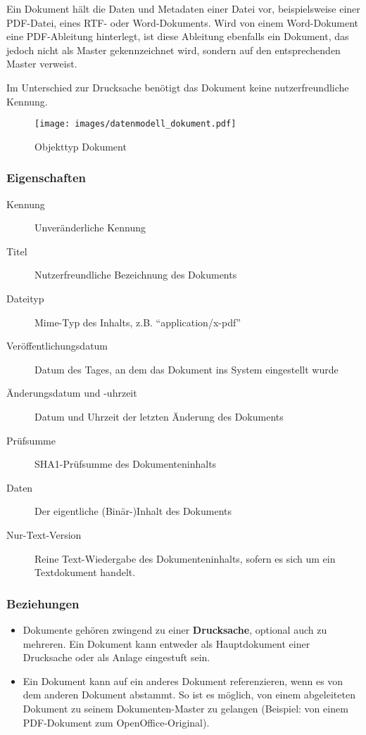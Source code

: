 \documentclass[,a4paper]{article}
\makeatletter
\def\maxwidth{\ifdim\Gin@nat@width>\linewidth\linewidth
\else\Gin@nat@width\fi}
\let\Oldincludegraphics\includegraphics
\renewcommand{\includegraphics}[1]{\Oldincludegraphics[width=\maxwidth]{#1}}
\makeatother
\begin{document}
Ein Dokument hält die Daten und Metadaten einer Datei vor,
beispielsweise einer PDF-Datei, eines RTF- oder Word-Dokuments. Wird von
einem Word-Dokument eine PDF-Ableitung hinterlegt, ist diese Ableitung
ebenfalls ein Dokument, das jedoch nicht als Master gekennzeichnet wird,
sondern auf den entsprechenden Master verweist.

Im Unterschied zur Drucksache benötigt das Dokument keine
nutzerfreundliche Kennung.

\begin{figure}[htbp]
\centering
\texttt{[image: images/datenmodell\_dokument.pdf]}
\caption{Objekttyp Dokument}
\end{figure}

\subsubsection{Eigenschaften}

\begin{description}
\item[Kennung]
Unveränderliche Kennung
\item[Titel]
Nutzerfreundliche Bezeichnung des Dokuments
\item[Dateityp]
Mime-Typ des Inhalts, z.B. ``application/x-pdf''
\item[Veröffentlichungsdatum]
Datum des Tages, an dem das Dokument ins System eingestellt wurde
\item[Änderungsdatum und -uhrzeit]
Datum und Uhrzeit der letzten Änderung des Dokuments
\item[Prüfsumme]
SHA1-Prüfsumme des Dokumenteninhalts
\item[Daten]
Der eigentliche (Binär-)Inhalt des Dokuments
\item[Nur-Text-Version]
Reine Text-Wiedergabe des Dokumenteninhalts, sofern es sich um ein
Textdokument handelt.
\end{description}

\subsubsection{Beziehungen}

\begin{itemize}
\item
  Dokumente gehören zwingend zu einer \textbf{Drucksache}, optional auch
  zu mehreren. Ein Dokument kann entweder als Hauptdokument einer
  Drucksache oder als Anlage eingestuft sein.
\item
  Ein Dokument kann auf ein anderes Dokument referenzieren, wenn es von
  dem anderen Dokument abstammt. So ist es möglich, von einem
  abgeleiteten Dokument zu seinem Dokumenten-Master zu gelangen
  (Beispiel: von einem PDF-Dokument zum OpenOffice-Original).
\end{itemize}
\end{document}

